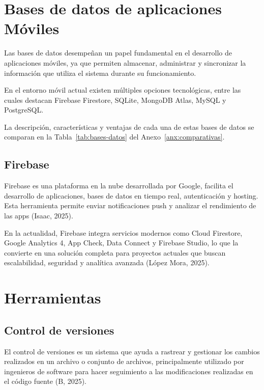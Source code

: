 \section{Bases de datos de aplicaciones Móviles}
\label{sec:bases-datos}

Las bases de datos desempeñan un papel fundamental en el desarrollo de
aplicaciones móviles, ya que permiten almacenar, administrar y sincronizar la
información que utiliza el sistema durante su funcionamiento.

En el entorno móvil actual existen múltiples opciones tecnológicas, entre las
cuales destacan Firebase Firestore, SQLite, MongoDB Atlas, MySQL y PostgreSQL.

La descripción, características y ventajas de cada una de estas bases de datos se comparan en la Tabla~\ref{tab:bases-datos} del Anexo~\ref{anx:comparativas}.

\subsection{Firebase}

Firebase es una plataforma en la nube desarrollada por Google, facilita el
desarrollo de aplicaciones, bases de datos en tiempo real, autenticación y
hosting. Esta herramienta permite enviar notificaciones push y analizar el
rendimiento de las apps (Isaac, 2025).

En la actualidad, Firebase integra servicios modernos como Cloud Firestore,
Google Analytics 4, App Check, Data Connect y Firebase Studio, lo que la
convierte en una solución completa para proyectos actuales que buscan
escalabilidad, seguridad y analítica avanzada (López Mora, 2025).

\section{Herramientas}
\label{sec:herramientas}

\subsection{Control de versiones}

El control de versiones es un sistema que ayuda a rastrear y gestionar los
cambios realizados en un archivo o conjunto de archivos, principalmente
utilizado por ingenieros de software para hacer seguimiento a las
modificaciones realizadas en el código fuente (B, 2025).

